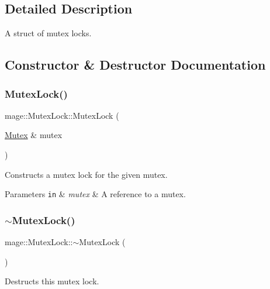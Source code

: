 \subsection{Detailed Description}
A struct of mutex locks. 

\subsection{Constructor \& Destructor Documentation}
\hypertarget{structmage_1_1_mutex_lock_aa8cd93677eec2656ca217fdf79f911c4}{}\label{structmage_1_1_mutex_lock_aa8cd93677eec2656ca217fdf79f911c4} 
\subsubsection{\texorpdfstring{Mutex\+Lock()}{MutexLock()}\hspace{0.1cm}{\footnotesize\ttfamily [1/3]}}
{\footnotesize\ttfamily mage\+::\+Mutex\+Lock\+::\+Mutex\+Lock (\begin{DoxyParamCaption}\item[{\hyperlink{classmage_1_1_mutex}{Mutex} \&}]{mutex }\end{DoxyParamCaption})}

Constructs a mutex lock for the given mutex.


\begin{DoxyParams}[1]{Parameters}
\mbox{\tt in}  & {\em mutex} & A reference to a mutex. \\
\hline
\end{DoxyParams}
\hypertarget{structmage_1_1_mutex_lock_a2631e8878646b2d25b136b6adb55d553}{}\label{structmage_1_1_mutex_lock_a2631e8878646b2d25b136b6adb55d553} 
\subsubsection{\texorpdfstring{$\sim$\+Mutex\+Lock()}{~MutexLock()}}
{\footnotesize\ttfamily mage\+::\+Mutex\+Lock\+::$\sim$\+Mutex\+Lock (\begin{DoxyParamCaption}{ }\end{DoxyParamCaption})}

Destructs this mutex lock. \hypertarget{structmage_1_1_mutex_lock_a20b0f44c31bcb2040cbf23f071870af9}{}\label{structmage_1_1_mutex_lock_a20b0f44c31bcb2040cbf23f071870af9} 

